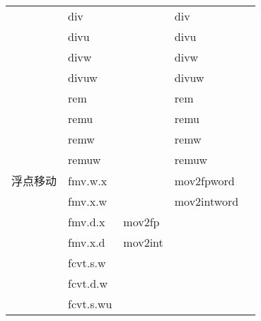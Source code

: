 \begin{longtable}{lllll}
                               & div                              &                              & div                            \\
                               & divu                             &                              & divu                           \\
                               & divw                             &                              & divw                           \\
                               & divuw                            &                              & divuw                          \\
                               & rem                              &                              & rem                            \\
                               & remu                             &                              & remu                           \\
                               & remw                             &                              & remw                           \\
                               & remuw                            &                              & remuw                          \\
                               \hline
    浮点移动                       & fmv.w.x                          &                              & mov2fpword                     \\
                               & fmv.x.w                          &                              & mov2intword                    \\
                               & fmv.d.x                          & mov2fp                       &                                \\
                               & fmv.x.d                          & mov2int                      &                                \\
                               & fcvt.s.w                         &                              &                                \\
                               & fcvt.d.w                         &                              &                                \\
                               & fcvt.s.wu                        &                              &                                \\

\end{longtable}
